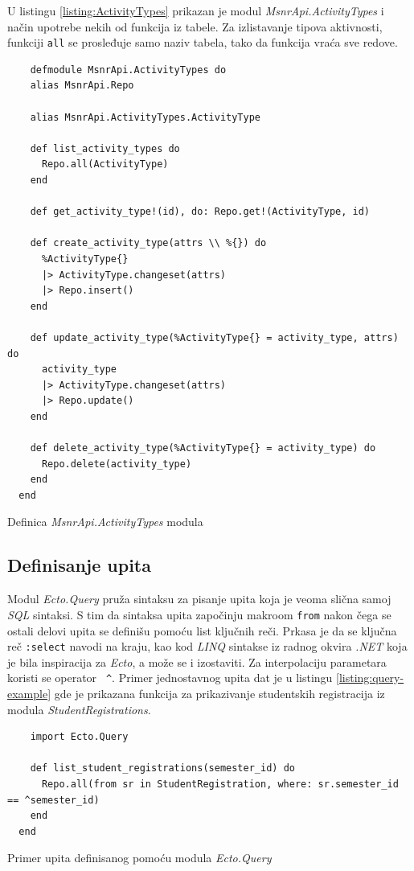 \documentclass[12pt,oneside]{memoir}
\begin{document}
U listingu \ref{listing:ActivityTypes} prikazan je modul
\emph{MsnrApi.ActivityTypes} i način upotrebe nekih od funkcija iz tabele. Za izlistavanje tipova aktivnosti,
funkciji \texttt{all} se prosleđuje samo naziv tabela, tako da funkcija vraća sve redove.
\begin{listing}[!h]
  \begin{verbatim}
    defmodule MsnrApi.ActivityTypes do
    alias MsnrApi.Repo
  
    alias MsnrApi.ActivityTypes.ActivityType
  
    def list_activity_types do
      Repo.all(ActivityType)
    end
  
    def get_activity_type!(id), do: Repo.get!(ActivityType, id)
  
    def create_activity_type(attrs \\ %{}) do
      %ActivityType{}
      |> ActivityType.changeset(attrs)
      |> Repo.insert()
    end
  
    def update_activity_type(%ActivityType{} = activity_type, attrs) do
      activity_type
      |> ActivityType.changeset(attrs)
      |> Repo.update()
    end
  
    def delete_activity_type(%ActivityType{} = activity_type) do
      Repo.delete(activity_type)
    end
  end
\end{verbatim}
\caption{Definica \emph{MsnrApi.ActivityTypes} modula}
\label{listing:ActivityTypes}
\end{listing}

\subsection{Definisanje upita}
Modul \emph{Ecto.Query} pruža sintaksu za pisanje upita koja je veoma slična samoj \emph{SQL} sintaksi. 
S tim da sintaksa upita započinju makroom \texttt{from} nakon čega se ostali delovi upita se definišu pomoću list ključnih reči.
Prkasa je da se ključna reč \texttt{:select} navodi na kraju, kao kod \emph{LINQ} sintakse iz radnog okvira \emph{.NET}
koja je bila inspiracija za \emph{Ecto}, a može se i izostaviti. Za interpolaciju parametara koristi se operator \texttt{ \^{}}.
Primer jednostavnog upita dat je u listingu \ref{listing:query-example} gde je prikazana funkcija za prikazivanje studentskih
registracija iz modula \emph{StudentRegistrations}.
\begin{listing}[h]
  \begin{verbatim}
    import Ecto.Query

    def list_student_registrations(semester_id) do
      Repo.all(from sr in StudentRegistration, where: sr.semester_id == ^semester_id)
    end
  end
  \end{verbatim}
\caption{Primer upita definisanog pomoću modula \emph{Ecto.Query}}
\label{listing:query-example}
\end{listing}
\end{document}
